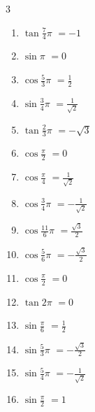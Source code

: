 \begin{multicols}{3}
\begin{enumerate}
  \item $\displaystyle \tan{\frac{7}{4}\pi}$
        $\displaystyle =-1$

\columnbreak %

  \item $\displaystyle \sin{\pi}$
        $\displaystyle =0$

  \item $\displaystyle \cos{\frac{5}{3}\pi}$
        $\displaystyle =\frac{1}{2}$

  \item $\displaystyle \sin{\frac{3}{4}\pi}$
        $\displaystyle =\frac{1}{\sqrt{2}}$

  \item $\displaystyle \tan{\frac{2}{3}\pi}$
        $\displaystyle =-\sqrt{3}$

  \item $\displaystyle \cos{\frac{\pi}{2}}$
        $\displaystyle =0$

  \item $\displaystyle \cos{\frac{\pi}{4}}$
        $\displaystyle =\frac{1}{\sqrt{2}}$

  \item $\displaystyle \cos{\frac{3}{4}\pi}$
        $\displaystyle =-\frac{1}{\sqrt{2}}$

  \item $\displaystyle \cos{\frac{11}{6}\pi}$
        $\displaystyle =\frac{\sqrt{3}}{2}$

  \item $\displaystyle \cos{\frac{5}{6}\pi}$
        $\displaystyle =-\frac{\sqrt{3}}{2}$

  \item $\displaystyle \cos{\frac{\pi}{2}}$
        $\displaystyle =0$

  \item $\displaystyle \tan{2\pi}$
        $\displaystyle =0$

  \item $\displaystyle \sin{\frac{\pi}{6}}$
        $\displaystyle =\frac{1}{2}$

  \item $\displaystyle \sin{\frac{5}{3}\pi}$
        $\displaystyle =-\frac{\sqrt{3}}{2}$

  \item $\displaystyle \sin{\frac{5}{4}\pi}$
        $\displaystyle =-\frac{1}{\sqrt{2}}$

  \item $\displaystyle \sin{\frac{\pi}{2}}$
        $\displaystyle =1$


\end{enumerate}
\end{multicols}
